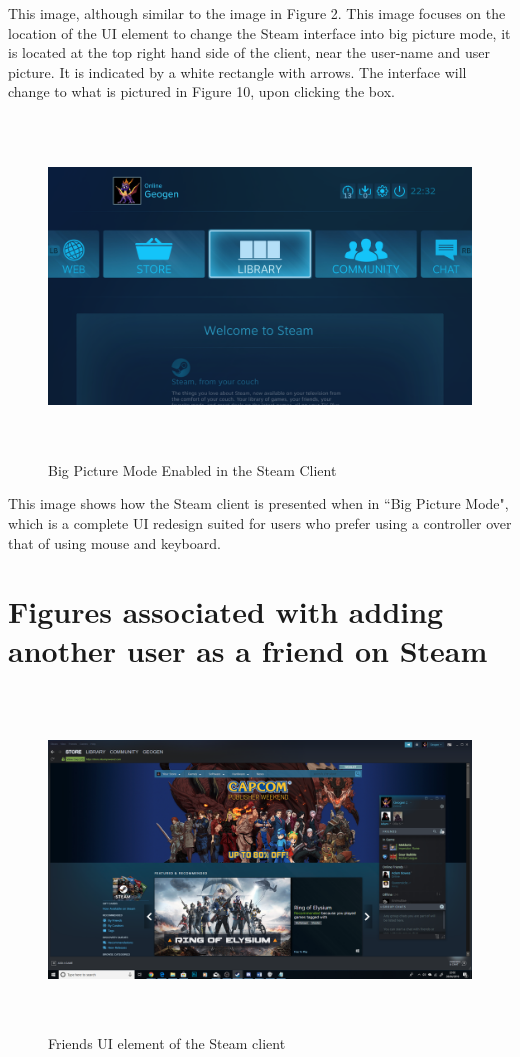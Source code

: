 This image, although similar to the image in Figure 2. This image focuses on the location of the UI element to change the Steam interface into big picture mode, it is located at the top right hand side of the client, near the user-name and user picture. It is indicated by a white rectangle with arrows. The interface will change to what is pictured in Figure 10, upon clicking the box.

\begin{figure}[H]
\includegraphics[width=16cm,height=9cm]{Screenshots/SteamScreenShots/SteamInBigPictureMode.png}
\caption{Big Picture Mode Enabled in the Steam Client}    
\end{figure}
This image shows how the Steam client is presented when in ``Big Picture Mode", which is a complete UI redesign suited for users who prefer using a controller over that of using mouse and keyboard.

\section{Figures associated with adding another user as a friend on Steam}

\begin{figure}[H]
\includegraphics[width=16cm,height=9cm]{Screenshots/SteamScreenShots/friendsUI.png}
\caption{Friends UI element of the Steam client}    
\end{figure}

